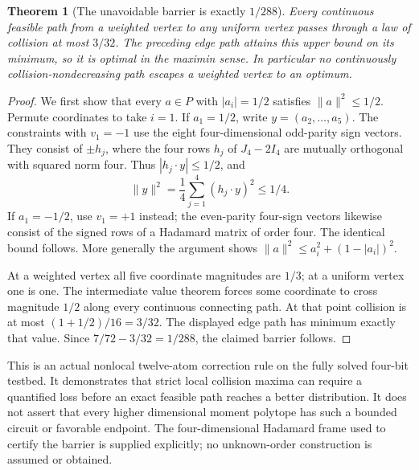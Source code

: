 \documentclass[11pt]{article}
\newtheorem{theorem}{Theorem}
\begin{document}
\begin{theorem}[The unavoidable barrier is exactly $1/288$]
Every continuous feasible path from a weighted vertex to any uniform
vertex passes through a law of collision at most $3/32$.
The preceding edge path attains this upper bound on its minimum, so
it is optimal in the maximin sense. In particular no continuously
collision-nondecreasing path escapes a weighted vertex to an optimum.
\end{theorem}
\begin{proof}
We first show that every $a\in P$ with $|a_i|=1/2$ satisfies
$\|a\|^2\le1/2$. Permute coordinates to take $i=1$.
If $a_1=1/2$, write $y=(a_2,\ldots,a_5)$. The constraints with
$v_1=-1$ use the eight four-dimensional odd-parity sign vectors.
They consist of $\pm h_j$, where the four rows $h_j$ of $J_4-2I_4$
are mutually orthogonal with squared norm four. Thus
$|h_j\cdot y|\le1/2$, and
\[
 \|y\|^2=\frac14\sum_{j=1}^4(h_j\cdot y)^2\le1/4.
\]
If $a_1=-1/2$, use $v_1=+1$ instead; the even-parity four-sign
vectors likewise consist of the signed rows of a Hadamard matrix
of order four. The identical bound follows. More generally the
argument shows $\|a\|^2\le a_i^2+(1-|a_i|)^2$.

At a weighted vertex all five coordinate magnitudes are $1/3$;
at a uniform vertex one is one. The intermediate value theorem
forces some coordinate to cross magnitude $1/2$ along every
continuous connecting path. At that point collision is at most
$(1+1/2)/16=3/32$. The displayed edge path has minimum exactly that
value. Since $7/72-3/32=1/288$, the claimed barrier follows.
\end{proof}

This is an actual nonlocal twelve-atom correction rule on the fully
solved four-bit testbed. It demonstrates that strict local collision
maxima can require a quantified loss before an exact feasible path
reaches a better distribution. It does not assert that every higher
dimensional moment polytope has such a bounded circuit or favorable
endpoint. The four-dimensional Hadamard frame used to certify the
barrier is supplied explicitly; no unknown-order construction is
assumed or obtained.
\end{document}
